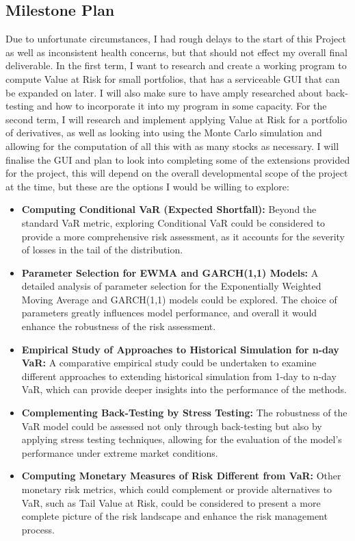 \documentclass{article}
\begin{document}
\subsection{Milestone Plan}
Due to unfortunate circumstances, I had rough delays to the start of this Project as well as inconsistent health concerns, but that should not effect my overall final deliverable. In the first term, I want to research and create a working program to compute Value at Risk for small portfolios, that has a serviceable GUI that can be expanded on later. I will also make sure to have amply researched about back-testing and how to incorporate it into my program in some capacity. For the second term, I will research and implement applying Value at Risk for a portfolio of derivatives, as well as looking into using the Monte Carlo simulation and allowing for the computation of all this with as many stocks as necessary. I will finalise the GUI and plan to look into completing some of the extensions provided for the project, this will depend on the overall developmental scope of the project at the time, but these are the options I would be willing to explore:

\begin{itemize}
  \item \textbf{Computing Conditional VaR (Expected Shortfall):}  Beyond the standard VaR metric, exploring Conditional VaR could be considered to provide a more comprehensive risk assessment, as it accounts for the severity of losses in the tail of the distribution.

  \item \textbf{Parameter Selection for EWMA and GARCH(1,1) Models:} A detailed analysis of parameter selection for the Exponentially Weighted Moving Average and GARCH(1,1) models could be explored. The choice of parameters greatly influences model performance, and overall it would enhance the robustness of the risk assessment.
  
  \item \textbf{Empirical Study of Approaches to Historical Simulation for n-day VaR:} A comparative empirical study could be undertaken to examine different approaches to extending historical simulation from 1-day to n-day VaR, which can provide deeper insights into the performance of the methods.
  
  \item \textbf{Complementing Back-Testing by Stress Testing:} The robustness of the VaR model could be assessed not only through back-testing but also by applying stress testing techniques, allowing for the evaluation of the model's performance under extreme market conditions.
  
  \item \textbf{Computing Monetary Measures of Risk Different from VaR:} Other monetary risk metrics, which could complement or provide alternatives to VaR, such as Tail Value at Risk, could be considered to present a more complete picture of the risk landscape and enhance the risk management process.
\end{itemize}
\end{document}
